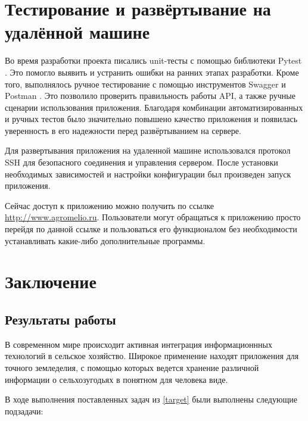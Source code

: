 \chapter{Тестирование и развёртывание на удалённой машине}
Во время разработки проекта писались unit-тесты с помощью библиотеки Pytest \cite{pytest}. Это помогло выявить и устранить ошибки на ранних этапах разработки. Кроме того, выполнялось ручное тестирование с помощью инструментов Swagger \cite{swagger} и Postman \cite{postman}. Это позволило проверить правильность работы API, а также ручные сценарии использования приложения. Благодаря комбинации автоматизированных и ручных тестов было значительно повышено качество приложения и появилась уверенность в его надежности перед развёртыванием на сервере.

Для развертывания приложения на удаленной машине использовался протокол SSH для безопасного соединения и управления сервером. После установки необходимых зависимостей и настройки конфигурации был произведен запуск приложения.

Сейчас доступ к приложению можно получить по ссылке \url{http://www.agromelio.ru}. Пользователи могут обращаться к приложению просто перейдя по данной ссылке и пользоваться его функционалом без необходимости устанавливать какие-либо дополнительные программы.


\chapter{Заключение}
    \section{Результаты работы}

    В современном мире происходит активная интеграция информационнных технологий в сельское хозяйство. Широкое применение находят приложения для точного земледелия, с помощью которых ведется хранение различной информации о сельхозугодьях в понятном для человека виде. 

   В ходе выполнения поставленных задач из \ref{target} были выполнены следующие подзадачи:

